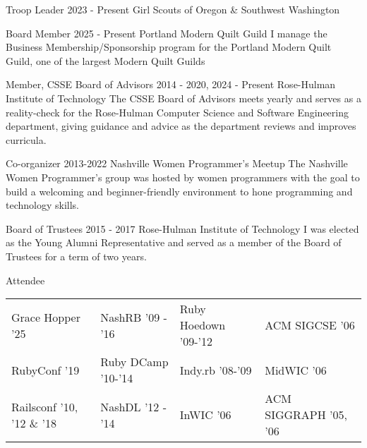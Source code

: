 
\begin{cventries}
  \cventry
    {Troop Leader}
    {2023 - Present}
    {Girl Scouts of Oregon \& Southwest Washington}
    {}
    {}

  \cventrywithorganizationnote
    {Board Member}
    {2025 - Present }
    {Portland Modern Quilt Guild}
    {I manage the Business Membership/Sponsorship program for the Portland Modern Quilt Guild, one of the largest Modern Quilt Guilds}
    {}
    {}

  \cventrywithorganizationnote
    {Member, CSSE Board of Advisors}
    {2014 - 2020, 2024 - Present}
    {Rose-Hulman Institute of Technology}
    {The CSSE Board of Advisors meets yearly and serves as a reality-check for the Rose-Hulman Computer Science and Software Engineering department, giving guidance and advice as the department reviews and improves curricula.}
    {}
    {}

  \cventrywithorganizationnote
    {Co-organizer}
    {2013-2022}
    {Nashville Women Programmer's Meetup}
    {The Nashville Women Programmer's group was hosted by women programmers with the goal to build a welcoming and beginner-friendly environment to hone programming and technology skills.}
    {}
    {}

  \cventrywithorganizationnote
    {Board of Trustees}
    {2015 - 2017}
    {Rose-Hulman Institute of Technology}
    {I was elected as the Young Alumni Representative and served as a member of the Board of Trustees for a term of two years.}
    {}
    {}


  \cventry
    {Attendee}
    {}
    {}
    {}
    {
      \begin{tabular}[t]{p{1.6in} p{1.6in} p{1.6in} p{1.6in}}
        Grace Hopper '25 & NashRB '09 - '16 & Ruby Hoedown '09-'12 & ACM SIGCSE '06 \\
        RubyConf '19  & Ruby DCamp '10-'14 & Indy.rb '08-'09 & MidWIC '06 \\
        Railsconf '10, '12 \& '18 & NashDL '12 - '14 & InWIC '06 & ACM SIGGRAPH '05, '06 \\
      \end{tabular}
    }
\end{cventries}
